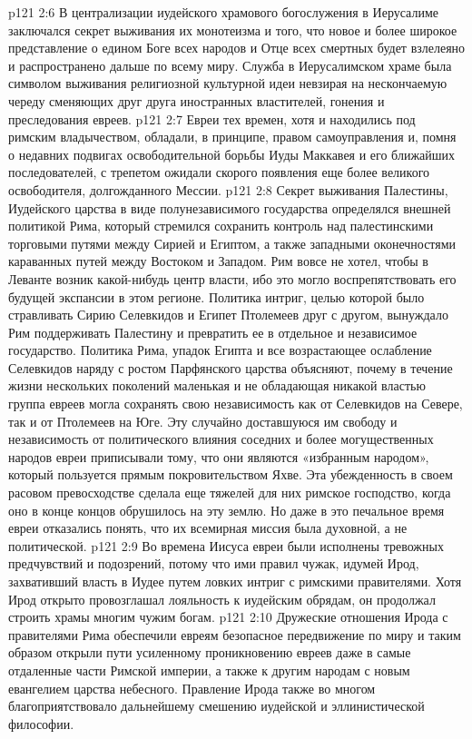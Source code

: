 \vs p121 2:6 В централизации иудейского храмового богослужения в Иерусалиме заключался секрет выживания их монотеизма и того, что новое и более широкое представление о едином Боге всех народов и Отце всех смертных будет взлелеяно и распространено дальше по всему миру. Служба в Иерусалимском храме была символом выживания религиозной культурной идеи невзирая на нескончаемую череду сменяющих друг друга иностранных властителей, гонения и преследования евреев.
\vs p121 2:7 \pc Евреи тех времен, хотя и находились под римским владычеством, обладали, в принципе, правом самоуправления и, помня о недавних подвигах освободительной борьбы Иуды Маккавея и его ближайших последователей, с трепетом ожидали скорого появления еще более великого освободителя, долгожданного Мессии.
\vs p121 2:8 Секрет выживания Палестины, Иудейского царства в виде полунезависимого государства определялся внешней политикой Рима, который стремился сохранить контроль над палестинскими торговыми путями между Сирией и Египтом, а также западными оконечностями караванных путей между Востоком и Западом. Рим вовсе не хотел, чтобы в Леванте возник какой\hyp{}нибудь центр власти, ибо это могло воспрепятствовать его будущей экспансии в этом регионе. Политика интриг, целью которой было стравливать Сирию Селевкидов и Египет Птолемеев друг с другом, вынуждало Рим поддерживать Палестину и превратить ее в отдельное и независимое государство. Политика Рима, упадок Египта и все возрастающее ослабление Селевкидов наряду с ростом Парфянского царства объясняют, почему в течение жизни нескольких поколений маленькая и не обладающая никакой властью группа евреев могла сохранять свою независимость как от Селевкидов на Севере, так и от Птолемеев на Юге. Эту случайно доставшуюся им свободу и независимость от политического влияния соседних и более могущественных народов евреи приписывали тому, что они являются «избранным народом», который пользуется прямым покровительством Яхве. Эта убежденность в своем расовом превосходстве сделала еще тяжелей для них римское господство, когда оно в конце концов обрушилось на эту землю. Но даже в это печальное время евреи отказались понять, что их всемирная миссия была духовной, а не политической.
\vs p121 2:9 \pc Во времена Иисуса евреи были исполнены тревожных предчувствий и подозрений, потому что ими правил чужак, идумей Ирод, захвативший власть в Иудее путем ловких интриг с римскими правителями. Хотя Ирод открыто провозглашал лояльность к иудейским обрядам, он продолжал строить храмы многим чужим богам.
\vs p121 2:10 Дружеские отношения Ирода с правителями Рима обеспечили евреям безопасное передвижение по миру и таким образом открыли пути усиленному проникновению евреев даже в самые отдаленные части Римской империи, а также к другим народам с новым евангелием царства небесного. Правление Ирода также во многом благоприятствовало дальнейшему смешению иудейской и эллинистической философии.

